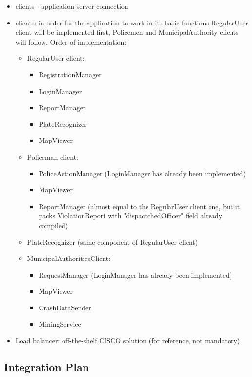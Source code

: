 \begin{itemize}
	\item clients - application server connection
	\item clients: in order for the application to work in its basic functions RegularUser client will be implemented first, Policemen and MunicipalAuthority clients will follow.\newline
	Order of implementation:
		\begin{itemize}
			\item RegularUser client:
			\begin{itemize}
				\item RegistrationManager
				\item LoginManager
				\item ReportManager
				\item PlateRecognizer
				\item MapViewer
			\end{itemize}
			\newpage
			\item Policeman client:
			\begin{itemize}
				\item PoliceActionManager (LoginManager has already been implemented)
				\item MapViewer
				\item ReportManager (almost equal to the RegularUser client one, but it packs ViolationReport with "dispactchedOfficer" field already compiled)
			\end{itemize}
			\item PlateRecognizer (same component of RegularUser client)
			\item MunicipalAuthoritiesClient:
				\begin{itemize}
					\item RequestManager (LoginManager has already been implemented)
					\item MapViewer
					\item CrashDataSender
					\item MiningService
				\end{itemize} 
			\end{itemize}
	\item Load balancer: off-the-shelf CISCO solution (for reference, not mandatory)
	\end{itemize} 

\subsection{Integration Plan}
